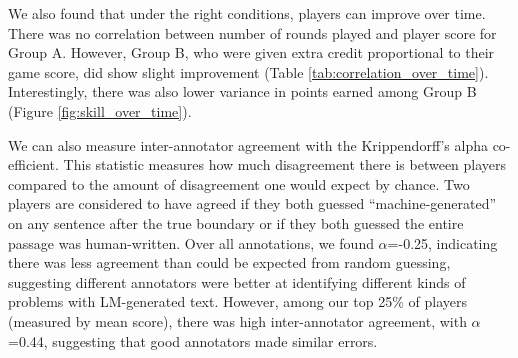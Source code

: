 We also found that under the right conditions, players can improve over time.
There was no correlation between number of rounds played and player score for Group A.
However, Group B, who were given extra credit proportional to their game score, did show slight improvement (Table \ref{tab:correlation_over_time}). 
Interestingly, there was also lower variance in points earned among Group B (Figure \ref{fig:skill_over_time}).



We can also measure inter-annotator agreement with the Krippendorff's alpha co-efficient.
This statistic measures how much disagreement there is between players compared to the amount of disagreement one would expect by chance.
Two players are considered to have agreed if they both guessed ``machine-generated'' on any sentence after the true boundary or if they both guessed the entire passage was human-written.
Over all annotations, we found $\alpha$=-0.25, indicating there was less agreement than could be expected from random guessing, suggesting different annotators were better at identifying different kinds of problems with LM-generated text.
However, among our top 25\% of players (measured by mean score), there was high inter-annotator agreement, with  $\alpha$=0.44, suggesting that good annotators made similar errors.

